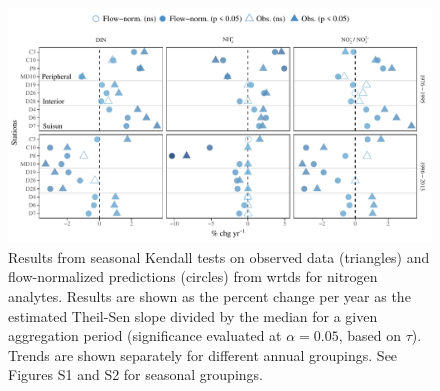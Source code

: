 \documentclass[letterpaper,12pt,oneside]{article}\usepackage[]{graphicx}\usepackage[]{color}
\begin{document}
\begin{figure}
\centering
\includegraphics[width=1\textwidth,page=1]{figs/trndcomp1.pdf}
\caption{Results from seasonal Kendall tests on observed data (triangles) and flow-normalized predictions (circles) from \ac{wrtds} for nitrogen analytes. Results are shown as the percent change per year as the estimated Theil-Sen slope divided by the median for a given aggregation period (significance evaluated at $\alpha = 0.05$, based on $\tau$). Trends are shown separately for different annual groupings. See Figures S1 and S2 for seasonal groupings.}
\label{fig:trndcomp1}   
\end{figure}
\end{document}
